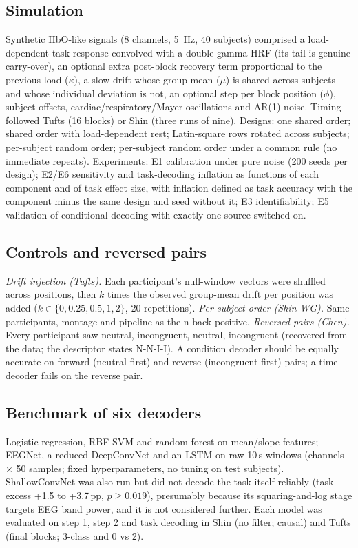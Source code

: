\documentclass[preprint,11pt]{elsarticle}
\newcommand{\pp}{\,pp}
\begin{document}
\subsection{Simulation}
\label{sec:sim-methods}
Synthetic HbO-like signals (8 channels, \SI{5}{Hz}, 40 subjects) comprised a load-dependent task response convolved with a double-gamma HRF (its tail is genuine carry-over), an optional extra post-block recovery term proportional to the previous load ($\kappa$), a slow drift whose group mean ($\mu$) is shared across subjects and whose individual deviation is not, an optional step per block position ($\phi$), subject offsets, cardiac/respiratory/Mayer oscillations and AR(1) noise. Timing followed Tufts (16 blocks) or Shin (three runs of nine). Designs: one shared order; shared order with load-dependent rest; Latin-square rows rotated across subjects; per-subject random order; per-subject random order under a common rule (no immediate repeats). Experiments: E1 calibration under pure noise (200 seeds per design); E2/E6 sensitivity and task-decoding inflation as functions of each component and of task effect size, with inflation defined as task accuracy with the component minus the same design and seed without it; E3 identifiability; E5 validation of conditional decoding with exactly one source switched on.

\subsection{Controls and reversed pairs}
\emph{Drift injection (Tufts).} Each participant's null-window vectors were shuffled across positions, then $k$ times the observed group-mean drift per position was added ($k\in\{0,0.25,0.5,1,2\}$, 20 repetitions).
\emph{Per-subject order (Shin WG).} Same participants, montage and pipeline as the n-back positive.
\emph{Reversed pairs (Chen).} Every participant saw neutral, incongruent, neutral, incongruent (recovered from the data; the descriptor states N-N-I-I). A condition decoder should be equally accurate on forward (neutral first) and reverse (incongruent first) pairs; a time decoder fails on the reverse pair.

\subsection{Benchmark of six decoders}
Logistic regression, RBF-SVM and random forest on mean/slope features; EEGNet, a reduced DeepConvNet and an LSTM on raw 10\,s windows (channels $\times$ 50 samples; fixed hyperparameters, no tuning on test subjects). ShallowConvNet was also run but did not decode the task itself reliably (task excess +1.5 to +3.7\pp, $p\ge0.019$), presumably because its squaring-and-log stage targets EEG band power, and it is not considered further. Each model was evaluated on step 1, step 2 and task decoding in Shin (no filter; causal) and Tufts (final blocks; 3-class and 0 vs 2).
\end{document}
